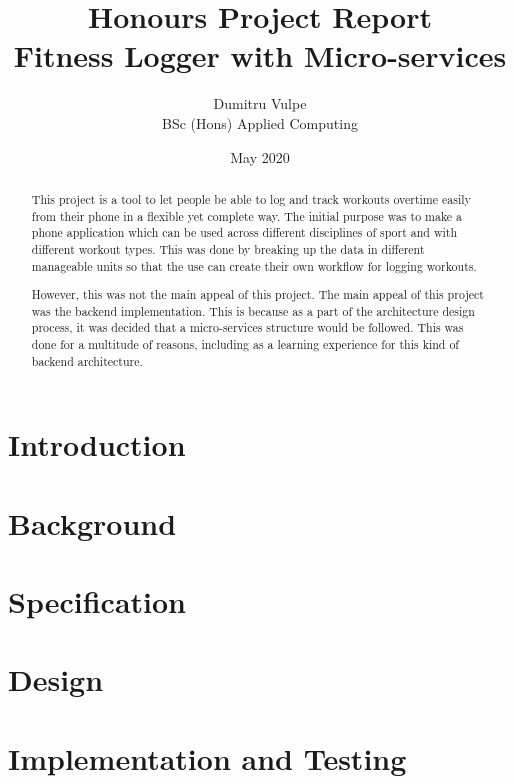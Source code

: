 \documentclass[twocolumn]{article}
\title{Honours Project Report\\Fitness Logger with Micro-services}
\author{Dumitru Vulpe\\BSc (Hons) Applied Computing}
\date{May 2020}
\begin{document}
\maketitle

\begin{abstract} %

  This project is a tool to let people be able to log and track workouts overtime easily from their phone in a flexible yet complete way. The initial purpose was to make a phone application which can be used across different disciplines of sport and with different workout types. This was done by breaking up the data in different manageable units so that the use can create their own workflow for logging workouts.

  However, this was not the main appeal of this project. The main appeal of this project was the backend implementation. This is because as a part of the architecture design process, it was decided that a micro-services structure would be followed. This was done for a multitude of reasons, including as a learning experience for this kind of  backend architecture.

\end{abstract}

\section{Introduction}
\vspace{-1ex}

\section{Background}
\vspace{-1ex}

\section{Specification}
\vspace{-1ex}

\section{Design}
\vspace{-1ex}

\section{Implementation and Testing}
\vspace{-1ex}
\end{document}
